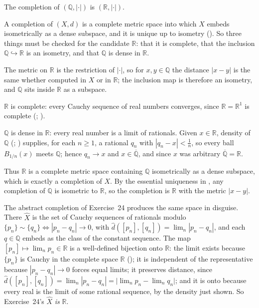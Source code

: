 \documentclass[main.tex]{subfiles}
\begin{document}
\begin{SolutionBlue}
The completion of $(\mathbb Q,|\cdot|)$ is $(\mathbb R,|\cdot|)$.

A completion of $(X,d)$ is a complete metric space into which $X$ embeds isometrically as a dense
subspace, and it is unique up to isometry (). So three things must be checked for the
candidate $\mathbb R$: that it is complete, that the inclusion $\mathbb Q\hookrightarrow\mathbb R$ is an
isometry, and that $\mathbb Q$ is dense in $\mathbb R$.

The metric on $\mathbb R$ is the restriction of $|\cdot|$, so for $x,y\in\mathbb Q$ the distance
$|x-y|$ is the same whether computed in $X$ or in $\mathbb R$; the inclusion map is therefore an
isometry, and $\mathbb Q$ sits inside $\mathbb R$ as a subspace.

$\mathbb R$ is complete: every Cauchy sequence of real numbers converges, since $\mathbb R=\mathbb
R^{1}$ is complete (; ).

$\mathbb Q$ is dense in $\mathbb R$: every real number is a limit of rationals. Given $x\in\mathbb R$,
density of $\mathbb Q$ (; ) supplies,
for each $n\ge 1$, a rational $q_n$ with $|q_n-x|<\tfrac1n$, so every ball $B_{1/n}(x)$ meets $\mathbb Q$;
hence $q_n\to x$ and $x\in\overline{\mathbb Q}$, and since $x$ was arbitrary $\overline{\mathbb Q}=\mathbb R$.

Thus $\mathbb R$ is a complete metric space containing $\mathbb Q$ isometrically as a dense subspace,
which is exactly a completion of $X$. By the essential uniqueness in , any completion of
$\mathbb Q$ is isometric to $\mathbb R$, so the completion is $\mathbb R$ with the metric $|x-y|$.

The abstract completion of Exercise~24 produces the same space in disguise. There $\widehat X$ is the
set of Cauchy sequences of rationals modulo $\{p_n\}\sim\{q_n\}\iff|p_n-q_n|\to0$, with
$\widehat d([p_n],[q_n])=\lim_n|p_n-q_n|$, and each $q\in\mathbb Q$ embeds as the class of the constant
sequence. The map $[p_n]\mapsto\lim_n p_n\in\mathbb R$ is a well-defined bijection onto $\mathbb R$: the
limit exists because $\{p_n\}$ is Cauchy in the complete space $\mathbb R$
(); it is independent of the representative
because $|p_n-q_n|\to0$ forces equal limits; it preserves distance, since
$\widehat d([p_n],[q_n])=\lim_n|p_n-q_n|=\bigl|\lim_n p_n-\lim_n q_n\bigr|$; and it is onto because
every real is the limit of some rational sequence, by the density just shown. So Exercise~24's
$\widehat X$ \emph{is} $\mathbb R$.
\end{SolutionBlue}
\end{document}
